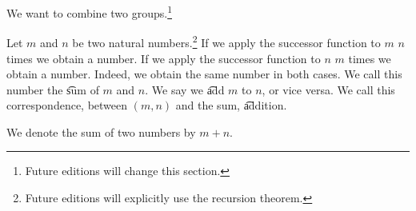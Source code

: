 

We want to combine two groups.\footnote{Future editions will change this section.}


Let $m$ and $n$ be two natural numbers.\footnote{Future editions will explicitly use the recursion theorem.}
If we apply the successor function to $m$ $n$
times we obtain a number.
If we apply the successor function to $n$ $m$
times we obtain a number.
Indeed, we obtain the same number in both cases.
We call this number the \t{sum}
of $m$ and $n$.
We say we \t{add} $m$ to $n$,
or vice versa.
We call this correspondence, between
$(m, n)$ and the sum, \t{addition}.


We denote the sum of two numbers by $m + n$.
